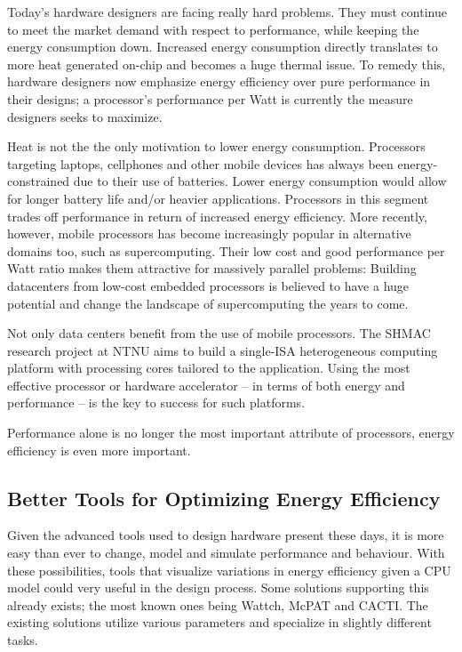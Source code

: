 Today's hardware designers are facing really hard problems. They must continue
to meet the market demand with respect to performance, while keeping the energy
consumption down. Increased energy consumption directly translates to more heat
generated on-chip and becomes a huge thermal issue. To remedy this, hardware
designers now emphasize energy efficiency over pure performance in their
designs; a processor's performance per Watt is currently the measure designers
seeks to maximize.

Heat is not the the only motivation to lower energy consumption. Processors
targeting laptops, cellphones and other mobile devices has always been
energy-constrained due to their use of batteries. Lower energy consumption would
allow for longer battery life and/or heavier applications. Processors in this
segment trades off performance in return of increased energy efficiency. More
recently, however, mobile processors has become increasingly popular in
alternative domains too, such as supercomputing. Their low cost and good
performance per Watt ratio makes them attractive for massively parallel
problems: Building datacenters from low-cost embedded processors is believed to
have a huge potential and change the landscape of supercomputing the years to
come.





Not only data centers benefit from the use of mobile processors. The SHMAC
research project at NTNU aims to build a single-ISA heterogeneous computing
platform with processing cores tailored to the application. Using the most
effective processor or hardware accelerator -- in terms of both energy
and performance -- is the key to success for such platforms.

Performance alone is no longer the most
important attribute of processors, energy efficiency is even more important.


\subsection{Better Tools for Optimizing Energy Efficiency}

Given the advanced tools used to design hardware present these days, it is more
easy than ever to change, model and simulate performance and behaviour. With
these possibilities, tools that visualize variations in energy efficiency given
a CPU model could very useful in the design process. Some solutions supporting
this already exists; the most known ones being Wattch\cite{brooks2000wattch},
McPAT\cite{hpmcpat,li2013mcpat} and CACTI\cite{hpcacti}. The existing solutions
utilize various parameters and specialize in slightly different tasks.

